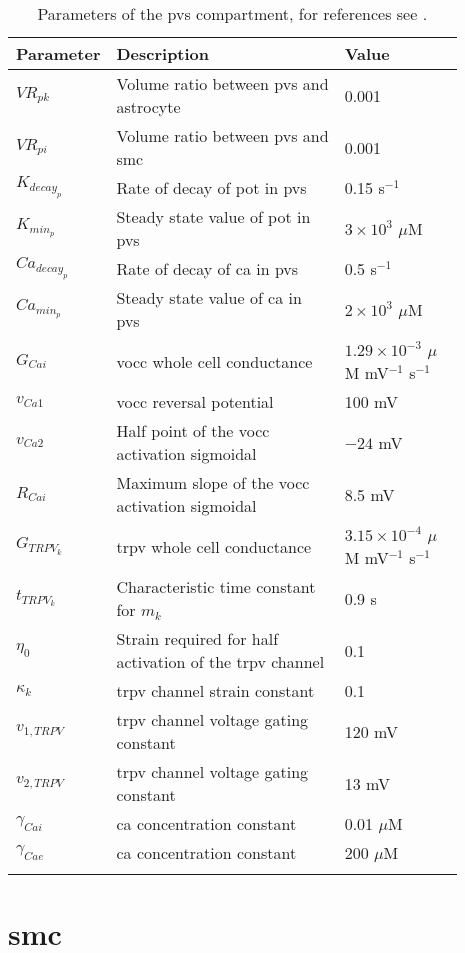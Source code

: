 \documentclass[11pt]{elsarticle}
\newcommand{\n}{$^{-1}$\xspace}
\newcommand{\e}[1]{\times 10^{#1}}
\newcommand{\psec}{s$^{-1}$\xspace}
\newcommand{\pot}{\gls{pot}\xspace}
\newcommand{\ca}{\gls{ca}\xspace}
\begin{document}
\begin{longtable}[h!]{ p{0.1\linewidth}   p{0.52\linewidth}   p{0.27\linewidth} }
	\hline
	Parameter & Description & Value \\
	\hline
$VR_{pk}$  & Volume ratio between \gls{pvs} and astrocyte   & 0.001 \\
$VR_{pi}$  & Volume ratio between \gls{pvs} and \gls{smc} & 0.001  \\
$K_{decay_p}$  & Rate of decay of \pot in \gls{pvs} & 0.15 \psec \\
$K_{min_p}$  & Steady state value of \pot in \gls{pvs} & $3\e{3}$ $\mu$M  \\
$Ca_{decay_p}$  & Rate of decay of \ca in \gls{pvs} & 0.5 \psec \\
$Ca_{min_p}$  & Steady state value of \ca in \gls{pvs} & $2\e{3}$ $\mu$M  \\
$G_{Cai}$  & \Gls{vocc} whole cell conductance & $1.29 \e{-3}$ $\mu$M mV\n \psec \\
$v_{Ca1}$  & \gls{vocc} reversal potential & 100 mV \\
$v_{Ca2}$ & Half point of the \gls{vocc} activation sigmoidal & $-24$ mV  \\
$R_{Cai}$ & Maximum slope of the \gls{vocc} activation sigmoidal & 8.5 mV \\
$G_{TRPV_k}$  & \Gls{trpv} whole cell conductance & $3.15 \e{-4}$ $\mu$M mV\n \psec \\
$t_{TRPV_k}$  & Characteristic time constant for $m_k$ & 0.9 s\\
$\eta_0$ & Strain required for half activation of the \gls{trpv} channel  & 0.1 \\
$\kappa_k$  & \gls{trpv} channel strain constant & 0.1  \\
$v_{1,TRPV}$ & \gls{trpv} channel voltage gating constant & 120 mV \\
$v_{2,TRPV}$ & \gls{trpv} channel voltage gating constant  & 13 mV \\
$\gamma_{Cai}$  & \ca concentration constant & 0.01 $\mu$M \\
$\gamma_{Cae}$& \ca concentration constant & 200 $\mu$M  \\
\hline
\caption{Parameters of the \gls{pvs} compartment, for references see \citet{Dormanns2015, Kenny2018}.}
		\end{longtable}

\section{\Gls{smc}}
%
\end{document}

